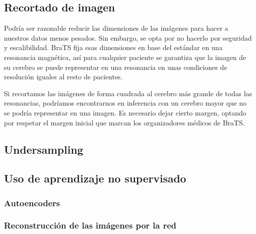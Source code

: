 \subsection{Recortado de imagen}

Podría ser razonable reducir las dimensiones de las imágenes para hacer a nuestros datos menos pesados. Sin embargo, se opta por no hacerlo por seguridad y escalibilidad. BraTS fija esas dimensiones en base del estándar en una resonancia magnética, así para cualquier paciente se garantiza que la imagen de su cerebro se puede representar en una resonancia en unas condiciones de resolución iguales al resto de pacientes.

Si recortamos las imágenes de forma cuadrada al cerebro más grande de todas las resonancias, podríamos encontrarnos en inferencia con un cerebro mayor que no se podría representar en una imagen. Es necesario dejar cierto margen, optando por respetar el margen inicial que marcan los organizadores médicos de BraTS.

\subsection{Undersampling}


\subsection{Uso de aprendizaje no supervisado}

\subsubsection{Autoencoders}

\subsubsection{Reconstrucción de las imágenes por la red}

